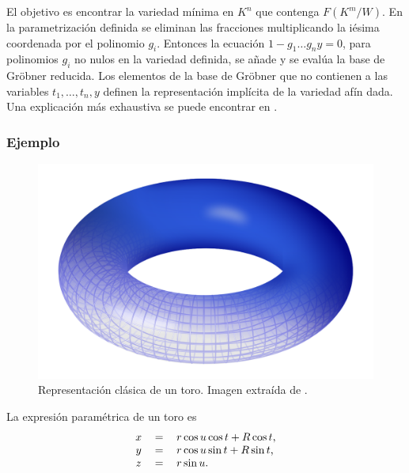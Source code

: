 El objetivo es encontrar la variedad mínima en $K^n$ que contenga $F(K^m / W)$. En la parametrización definida se eliminan las fracciones multiplicando la iésima coordenada por el polinomio $g_i$. Entonces la ecuación $1 - g_1 \dotso g_n y = 0$, para polinomios $g_i$ no nulos en la variedad definida, se añade  y se evalúa la base de Gröbner reducida. Los elementos de la base de Gröbner que no contienen a las variables $t_1, \dotso, t_n, y$ definen la representación implícita de la variedad afín dada.
\\Una explicación más exhaustiva se puede encontrar en \cite{Hoffmann93}.

\subsubsection*{Ejemplo}

\begin{figure}[h]
\centering
\includegraphics[width=0.5\linewidth]{images/Torus.png}
\caption{Representación clásica de un toro. Imagen extraída de \cite{Wikipedia:Torus}.}
\end{figure}

La expresión paramétrica de un toro es
\begin{equation}
\begin{tabular}{c c l}
$x$ & $=$ & $r \cos u \cos t + R \cos t$, \\
$y$ & $=$ & $r \cos u \sin t + R \sin t$, \\
$z$ & $=$ & $r \sin u$.
\end{tabular}
\nonumber
\end{equation}

